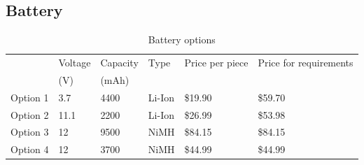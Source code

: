 \documentclass[11pt,twoside,a4paper]{report}
\begin{document}
\begin{appendices}
\chapter{Battery}
\begin{table}[h]
\caption{Battery options}
\begin{tabular}{llllll}
  & Voltage  & Capacity & Type  & Price per piece & Price for requirements          \\
         & (V)      & (mAh) &                 &                        &         \\
Option 1 & 3.7      & 4400  & Li-Ion          & \$19.90                & \$59.70 \\
Option 2 & 11.1     & 2200  & Li-Ion          & \$26.99                & \$53.98 \\
Option 3 & 12       & 9500  & NiMH            & \$84.15                & \$84.15 \\
Option 4 & 12       & 3700  & NiMH            & \$44.99                & \$44.99
\end{tabular}
\label{table:batteryOptions}
\end{table}


\end{appendices}
\end{document}
